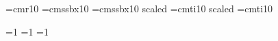 
\font\mainfont=cmr10
\font\chheadfont=cmssbx10
\font\bkheadfont=cmssbx10 scaled 
\font\titlefont=cmti10 scaled 
\font\emphfont=cmti10

=1
=1
=1

\def\ejtoodd#1{\ifodd\count0\null\break\eject\null\break\eject\else\null\break\eject\fi}

\def\title#1{\centerline{\titlefont #1}\vskip 26pt \centerline{\bkheadfont \versionname}\eject}

\def\version#1{\def\versionname{The #1 Version}}

\def\testament#1{\ejtoodd{}\rightline{\titlefont The #1 Testament}\eject\count12=1}

\def\book#1{{\bkheadfont #1\break}\count10=1\count11=1}

\def\chapter{{\chheadfont \number\count10}\count11=1}

\def\verse{$ ^{\number\count11} $\advance\count11 by 1}

\def\emph#1{}
